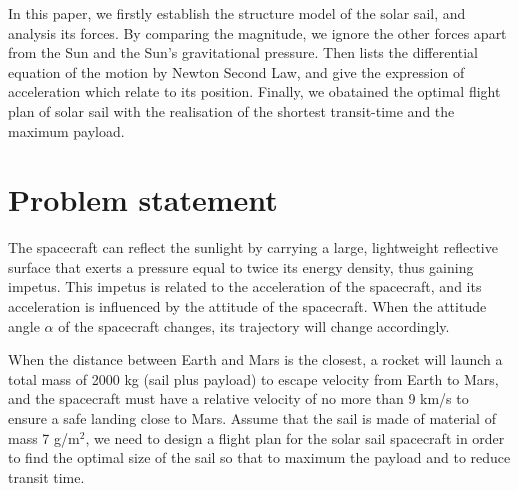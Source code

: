 \documentclass[../Paper.tex]{subfiles}
\begin{document}
In this paper, we firstly establish the structure model of the solar sail, and analysis its forces. By comparing the magnitude, we ignore the other forces apart from the Sun and the Sun's gravitational pressure. Then lists the differential equation of the motion by Newton Second Law, and give the expression of acceleration which relate to its position. Finally, we obatained the optimal flight plan of solar sail with the realisation of the shortest transit-time and the maximum payload. 

\section{Problem statement}

The spacecraft can reflect the sunlight by carrying a large, lightweight reflective surface that exerts a pressure equal to twice its energy density, thus gaining impetus. This impetus is related to the acceleration of the spacecraft, and its acceleration is influenced by the attitude of the spacecraft. When the attitude angle $\alpha$ of the spacecraft changes, its trajectory will change accordingly. 

When the distance between Earth and Mars is the closest, a rocket will launch a total mass of 2000 kg (sail plus payload) to escape velocity from Earth to Mars, and the spacecraft must have a relative velocity of no more than 9 km/s to ensure a safe landing close to Mars. Assume that the sail is made of material of mass 7 g/m$^2$, we need to design a flight plan for the solar sail spacecraft in order to find the optimal size of the sail so that to maximum the payload and to reduce transit time.


 
\end{document}
